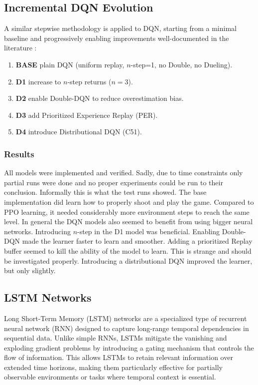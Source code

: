 \subsection{Incremental DQN Evolution}

A similar stepwise methodology is applied to DQN, starting from a minimal
baseline and progressively enabling improvements well-documented in the
literature \cite{mnih2015human, vanhasselt2016double, wang2016dueling,
schaul2015prioritized, bellemare2017distributional}:

\begin{enumerate}
    \item \textbf{BASE}  plain DQN (uniform replay, $n$-step=1, no Double, no Dueling).
    \item \textbf{D1}  increase to $n$-step returns ($n=3$).
    \item \textbf{D2}  enable Double-DQN to reduce overestimation bias.
    \item \textbf{D3}  add Prioritized Experience Replay (PER).
    \item \textbf{D4}  introduce Distributional DQN (C51).
\end{enumerate}

\subsubsection{Results}
All models were implemented and verified. Sadly, due to time constraints only partial runs were done and no proper experiments could be run to their conclusion. Informally this is what the test runs showed. The base implementation did learn how to properly shoot and play the game. Compared to PPO learning, it needed considerably more environment steps to reach the same level. In general the DQN models also seemed to benefit from using bigger neural networks. Introducing $n$-step in the D1 model was beneficial. Enabling Double-DQN made the learner faster to learn and smoother. Adding a prioritized Replay buffer seemed to kill the ability of the model to learn. This is strange and should be investigated properly. Introducing a distributional DQN improved the learner, but only slightly.

\subsection{LSTM Networks}

Long Short-Term Memory (LSTM) networks \cite{hochreiter1997long} are a
specialized type of recurrent neural network (RNN) designed to capture
long-range temporal dependencies in sequential data. Unlike simple RNNs, LSTMs
mitigate the vanishing and exploding gradient problems by introducing a gating
mechanism that controls the flow of
information. This allows LSTMs to retain relevant information over extended
time horizons, making them particularly effective for partially observable
environments or tasks where temporal context is essential.

